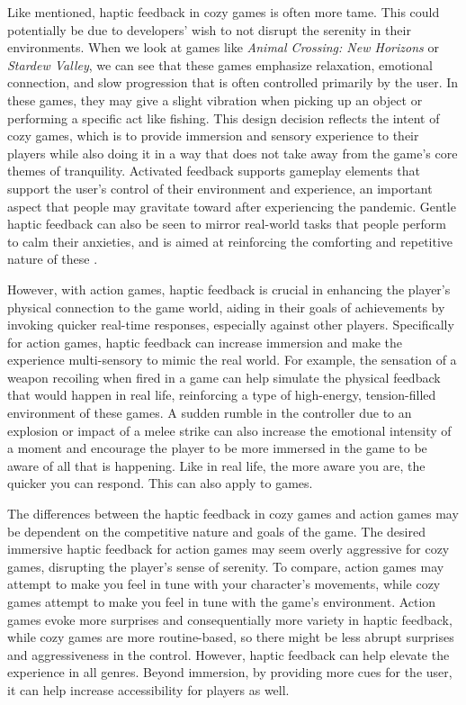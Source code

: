 \documentclass[10pt,twocolumn]{article}
\begin{document}
Like mentioned, haptic feedback in cozy games is often more tame. This could potentially be due to developers' wish to not disrupt the serenity in their environments.\cite{Cozy} When we look at games like \textit{Animal Crossing: New Horizons} or \textit{Stardew Valley}, we can see that these games emphasize relaxation, emotional connection, and slow progression that is often controlled primarily by the user. In these games, they may give a slight vibration when picking up an object or performing a specific act like fishing. This design decision reflects the intent of cozy games, which is to provide immersion and sensory experience to their players while also doing it in a way that does not take away from the game's core themes of tranquility. Activated feedback supports gameplay elements that support the user's control of their environment and experience, an important aspect that people may gravitate toward after experiencing the pandemic\cite{Pandemic}. Gentle haptic feedback can also be seen to mirror real-world tasks that people perform to calm their anxieties, and is aimed at reinforcing the comforting and repetitive nature of these \cite{pub:74942}.

However, with action games, haptic feedback is crucial in enhancing the player's physical connection to the game world, aiding in their goals of achievements by invoking quicker real-time responses, especially against other players. Specifically for action games, haptic feedback can increase immersion and make the experience multi-sensory to mimic the real world.\cite{SöDerströM_Larsson_Lundqvist_Norberg_Andersson_Mejtoft_2022} For example, the sensation of a weapon recoiling when fired in a game can help simulate the physical feedback that would happen in real life, reinforcing a type of high-energy, tension-filled environment of these games. A sudden rumble in the controller due to an explosion or impact of a melee strike can also increase the emotional intensity of a moment and encourage the player to be more immersed in the game to be aware of all that is happening. Like in real life, the more aware you are, the quicker you can respond. This can also apply to games. 

The differences between the haptic feedback in cozy games and action games may be dependent on the competitive nature and goals of the game. The desired immersive haptic feedback for action games may seem overly aggressive for cozy games, disrupting the player's sense of serenity. To compare, action games may attempt to make you feel in tune with your character's movements, while cozy games attempt to make you feel in tune with the game's environment. Action games evoke more surprises and consequentially more variety in haptic feedback, while cozy games are more routine-based, so there might be less abrupt surprises and aggressiveness in the control. However, haptic feedback can help elevate the experience in all genres.\cite{saddik_haptics_2012} Beyond immersion, by providing more cues for the user, it can help increase accessibility for players as well.\cite{Ganis_Gulli_Fontana_Serafin_2023}
\end{document}

